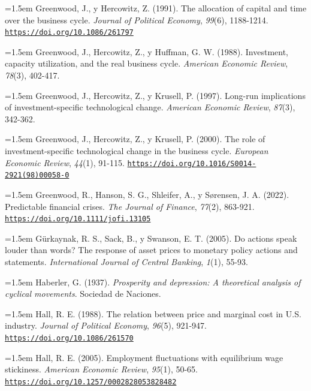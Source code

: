\documentclass[10pt,a4paper]{article}
\begin{document}
\noindent\hangindent=1.5em Greenwood, J., y Hercowitz, Z. (1991). The allocation of capital and time over the business cycle. \textit{Journal of Political Economy}, \textit{99}(6), 1188-1214. \href{https://doi.org/10.1086/261797}{\nolinkurl{https://doi.org/10.1086/261797}}

\noindent\hangindent=1.5em Greenwood, J., Hercowitz, Z., y Huffman, G. W. (1988). Investment, capacity utilization, and the real business cycle. \textit{American Economic Review}, \textit{78}(3), 402-417.

\noindent\hangindent=1.5em Greenwood, J., Hercowitz, Z., y Krusell, P. (1997). Long-run implications of investment-specific technological change. \textit{American Economic Review}, \textit{87}(3), 342-362.

\noindent\hangindent=1.5em Greenwood, J., Hercowitz, Z., y Krusell, P. (2000). The role of investment-specific technological change in the business cycle. \textit{European Economic Review}, \textit{44}(1), 91-115. \href{https://doi.org/10.1016/S0014-2921(98)00058-0}{\nolinkurl{https://doi.org/10.1016/S0014-2921(98)00058-0}}

\noindent\hangindent=1.5em Greenwood, R., Hanson, S. G., Shleifer, A., y Sørensen, J. A. (2022). Predictable financial crises. \textit{The Journal of Finance}, \textit{77}(2), 863-921. \href{https://doi.org/10.1111/jofi.13105}{\nolinkurl{https://doi.org/10.1111/jofi.13105}}

\noindent\hangindent=1.5em Gürkaynak, R. S., Sack, B., y Swanson, E. T. (2005). Do actions speak louder than words? The response of asset prices to monetary policy actions and statements. \textit{International Journal of Central Banking}, \textit{1}(1), 55-93.

\noindent\hangindent=1.5em Haberler, G. (1937). \textit{Prosperity and depression: A theoretical analysis of cyclical movements}. Sociedad de Naciones.

\noindent\hangindent=1.5em Hall, R. E. (1988). The relation between price and marginal cost in U.S. industry. \textit{Journal of Political Economy}, \textit{96}(5), 921-947. \href{https://doi.org/10.1086/261570}{\nolinkurl{https://doi.org/10.1086/261570}}

\noindent\hangindent=1.5em Hall, R. E. (2005). Employment fluctuations with equilibrium wage stickiness. \textit{American Economic Review}, \textit{95}(1), 50-65. \href{https://doi.org/10.1257/0002828053828482}{\nolinkurl{https://doi.org/10.1257/0002828053828482}}
\end{document}
